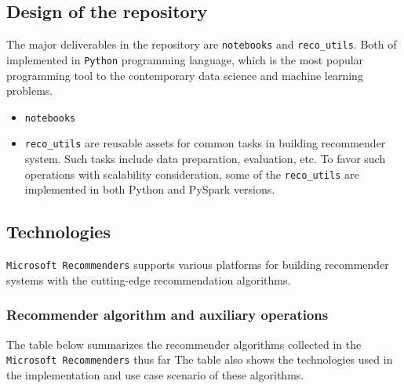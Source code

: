 \documentclass[twoside,11pt]{article}
\begin{document}
\subsection{Design of the repository}
The major deliverables in the repository are \verb|notebooks| and \verb|reco_utils|. Both of implemented in \verb|Python| programming language, which is the most popular programming tool to the contemporary data science and machine learning problems.

\begin{itemize}
 \item \verb|notebooks|
 \item \verb|reco_utils| are reusable assets for common tasks in building recommender system. Such tasks include data preparation, evaluation, etc. To favor such operations with scalability consideration, some of the \verb|reco_utils| are implemented in both Python and PySpark versions.
\end{itemize}

\subsection{Technologies}
\verb|Microsoft Recommenders| supports various platforms for building recommender systems with the cutting-edge recommendation algorithms.

\subsubsection{Recommender algorithm and auxiliary operations}
 The table below summarizes the recommender algorithms collected in the \verb|Microsoft Recommenders| thus far \citep{ke2017lightgbm,wang2018dkn,lian2018xdeepfm,howard2018fastai,he2017neural,salakhutdinov2007restricted,cheng2016wide,diev2015sar,koren2009matrix} The table also shows the technologies used in the implementation and use case scenario of these algorithms.
\end{document}
